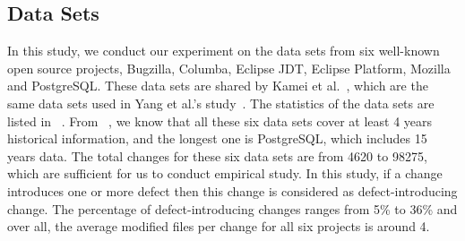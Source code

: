 \subsection{Data Sets}
In this study, we conduct our experiment on the data sets
from six well-known open source projects, Bugzilla, 
Columba, Eclipse JDT, Eclipse Platform, Mozilla and PostgreSQL.
These data sets are shared by Kamei et al.~\cite{kamei2013large},
which are the same data sets used in Yang et al.'s study~\cite{yang2016effort}.
The statistics of the data sets are listed in ~.
From ~, we know that all these six data sets
cover at least 4 years historical information, and the longest one is PostgreSQL, 
which includes 15 years data. The total changes for these six data sets
are from 4620 to 98275, which are sufficient for us to conduct
empirical study. In this study, if a change introduces one or more defect then
this change is considered as defect-introducing change. The percentage of 
defect-introducing changes ranges from 5\% to 36\% and over all, the average
modified files per change for all six projects is around 4.

\begin{table}[]
    \centering
    \caption{Statistics of the Studied Data Sets}
    \label{tab:datasets}
\end{table}



